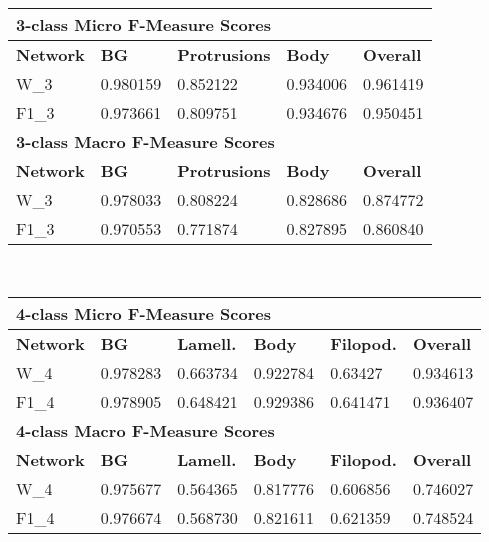 
\begin {table}
	\begin{flushleft}
		\begin {tabular}[!htb]{|l|l|l|l|l|}
			\hline\multicolumn{5}{|l|}{\textbf{3-class Micro F-Measure Scores}} \\ \hline
			\textbf{Network}& \textbf{BG}& \textbf{Protrusions}& \textbf{Body}& \textbf{Overall} \\ \hline
			W\_3& \cellcolor{green!25}0.980159& \cellcolor{green!25}0.852122& 0.934006& \cellcolor{green!25}0.961419 \\ \hline
			F1\_3& 0.973661& 0.809751& \cellcolor{green!25}0.934676& 0.950451\\ \hline
			\multicolumn{5}{|l|}{\textbf{3-class Macro F-Measure Scores}} \\ \hline
			\textbf{Network}& \textbf{BG}& \textbf{Protrusions}& \textbf{Body}& \textbf{Overall} \\ \hline
			W\_3& \cellcolor{green!25}0.978033& \cellcolor{green!25}0.808224& \cellcolor{green!25}0.828686& \cellcolor{green!25}0.874772 \\ \hline
			F1\_3& 0.970553& 0.771874& 0.827895& 0.860840\\ \hline
		\end {tabular}
		\vspace{0.5cm}\\
		\begin {tabular}[!htb]{|l|l|l|l|l|l|}
			\hline\multicolumn{6}{|l|}{\textbf{4-class Micro F-Measure Scores}} \\ \hline
			\textbf{Network}& \textbf{BG}& \textbf{Lamell.}& \textbf{Body}& \textbf{Filopod.}& \textbf{Overall} \\ \hline
			W\_4& 0.978283& \cellcolor{green!25}0.663734& 0.922784& 0.63427& 0.934613 \\ \hline
			F1\_4& \cellcolor{green!25}0.978905& 0.648421& \cellcolor{green!25}0.929386& \cellcolor{green!25}0.641471& \cellcolor{green!25}0.936407 \\ \hline
			\multicolumn{6}{|l|}{\textbf{4-class Macro F-Measure Scores}} \\ \hline
			\textbf{Network}& \textbf{BG}& \textbf{Lamell.}& \textbf{Body}& \textbf{Filopod.}& \textbf{Overall} \\ \hline
			W\_4& 0.975677& 0.564365& 0.817776& 0.606856& 0.746027 \\ \hline
			F1\_4& \cellcolor{green!25}0.976674& \cellcolor{green!25}0.568730& \cellcolor{green!25}0.821611& \cellcolor{green!25}0.621359& \cellcolor{green!25}0.748524 \\ \hline
		\end {tabular}
	\end {flushleft}


\end{table}
